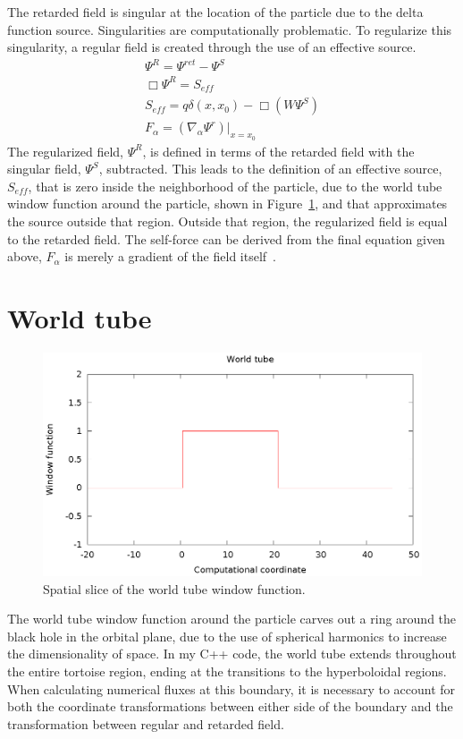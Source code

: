 The retarded field is singular at the location of the particle due to the delta function source. Singularities are computationally problematic. To regularize this singularity, a regular field is created through the use of an effective source.
\begin{eqnarray}
\Psi^R=\Psi^{ret}-\Psi^S\\
\Box\Psi^R=S_{eff}\\
S_{eff}=q\delta(x,x_0)-\Box(W\Psi^S)\\
F_\alpha=(\nabla_\alpha\Psi^r)|_{x=x_0}
\end{eqnarray}
The regularized field, $\Psi^R$, is defined in terms of the retarded field with the singular field, $\Psi^S$, subtracted. This leads to the definition of an effective source, $S_{eff}$, that is zero inside the neighborhood of the particle, due to the world tube window function around the particle, shown in Figure~\ref{wtwindow}, and that approximates the source outside that region. Outside that region, the regularized field is equal to the retarded field. The self-force can be derived from the final equation given above, $F_\alpha$ is merely a gradient of the field itself~\cite{vega_wardell_diener_eff_source}. 


\section{World tube}
\begin{figure}
\includegraphics{worldTubeItself}
\caption{Spatial slice of the world tube window function.}
\label{wtwindow}
\end{figure}

The world tube window function around the particle carves out a ring around the black hole in the orbital plane, due to the use of spherical harmonics to increase the dimensionality of space. In my C++ code, the world tube extends throughout the entire tortoise region, ending at the transitions to the hyperboloidal regions. When calculating numerical fluxes at this boundary, it is necessary to account for both the coordinate transformations between either side of the boundary and the transformation between regular and retarded field.


